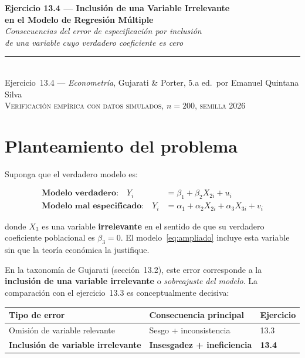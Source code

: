 \documentclass[12pt, letterpaper]{article}
\begin{document}

\begin{center}
  {\LARGE\bfseries Ejercicio 13.4 --- Inclusión de una Variable Irrelevante}\\[6pt]
  {\LARGE\bfseries en el Modelo de Regresión Múltiple}\\[12pt]
  {\large\itshape Consecuencias del error de especificación por inclusión}\\
  {\large\itshape de una variable cuyo verdadero coeficiente es cero}\\[14pt]
  \rule{0.55\linewidth}{0.6pt}\\[8pt]
  {\normalsize Ejercicio~13.4 --- \textit{Econometría}, Gujarati \& Porter, 5.a ed.\
  por Emanuel Quintana Silva}\\[4pt]
  {\small\textsc{Verificación empírica con datos simulados, $n = 200$, semilla 2026}}
\end{center}

\vspace{10pt}

\section{Planteamiento del problema}

Suponga que el verdadero modelo es:

\begin{align}
  \textbf{Modelo verdadero:} \quad
  Y_i &= \beta_1 + \beta_2 X_{2i} + u_i \label{eq:verdadero}\\[6pt]
  \textbf{Modelo mal especificado:} \quad
  Y_i &= \alpha_1 + \alpha_2 X_{2i} + \alpha_3 X_{3i} + v_i \label{eq:ampliado}
\end{align}

donde $X_3$ es una variable \textbf{irrelevante} en el sentido de que su
verdadero coeficiente poblacional es $\beta_3 = 0$. El modelo~\eqref{eq:ampliado}
incluye esta variable sin que la teoría económica la justifique.

En la taxonomía de Gujarati (sección~13.2), este error corresponde a la
\textbf{inclusión de una variable irrelevante} o \textit{sobreajuste del modelo}.
La comparación con el ejercicio~13.3 es conceptualmente decisiva:

\begin{center}
\renewcommand{\arraystretch}{1.3}
\small
\begin{tabular}{lll}
\toprule
\textbf{Tipo de error} & \textbf{Consecuencia principal} & \textbf{Ejercicio} \\
\midrule
Omisión de variable relevante & Sesgo + inconsistencia & 13.3 \\
\textbf{Inclusión de variable irrelevante} & \textbf{Insesgadez + ineficiencia} & \textbf{13.4} \\
\bottomrule
\end{tabular}
\end{center}
\end{document}
